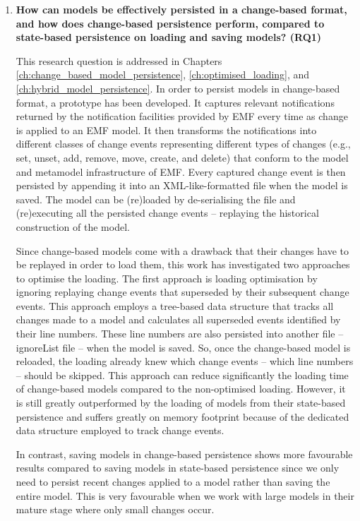 \begin{enumerate} 
  \item \textbf{How can models be effectively persisted in a change-based format, and how does change-based persistence perform, compared to state-based persistence on loading and saving models? (RQ1)} 
  
  This research question is addressed in Chapters \ref{ch:change_based_model_persistence}, \ref{ch:optimised_loading}, and \ref{ch:hybrid_model_persistence}. In order to persist models in change-based format, a prototype has been developed. It captures relevant notifications returned by the notification facilities provided by EMF every time as change is applied to an EMF model. It then transforms the notifications into different classes of change events representing different types of changes (e.g., set, unset, add, remove, move, create, and delete) that conform to the model and metamodel infrastructure of EMF. Every captured change event is then persisted by appending it into an XML-like-formatted file when the model is saved. The model can be (re)loaded by de-serialising the file and (re)executing all the persisted change events -- replaying the historical construction of the model.
  
  Since change-based models come with a drawback that their changes have to be replayed in order to load them, this work has investigated two approaches to optimise the loading. The first approach is loading optimisation by ignoring replaying change events that superseded by their subsequent change events. This approach employs a tree-based data structure that tracks all changes made to a model and calculates all superseded events identified by their line numbers. These line numbers are also persisted into another file -- \textsf{ignoreList} file -- when the model is saved. So, once the change-based model is reloaded, the loading already knew which change events -- which line numbers -- should be skipped. This approach can reduce significantly the loading time of change-based models compared to the non-optimised loading. However, it is still greatly outperformed by the loading of models from their state-based persistence and suffers greatly on memory footprint because of the dedicated data structure employed to track change events. 
  
  In contrast, saving models in change-based persistence shows more favourable results compared to saving models in state-based persistence since we only need to persist recent changes applied to a model rather than saving the entire model. This is very favourable when we work with large models in their mature stage where only small changes occur. 
  

\end{enumerate}
